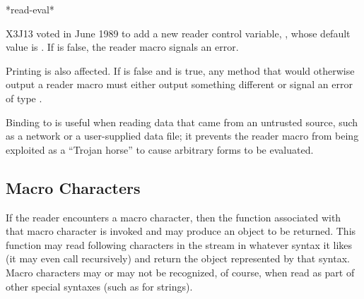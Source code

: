 \begin{newer}
\begin{defun}[Variable]
*read-eval*

X3J13 voted in June 1989  to add a new reader control variable,
, whose default value is .
If  is false, the  reader macro signals an error.

Printing is also affected.  If
   is false and  is true, any 
  method that would otherwise output a  reader macro must either output something
  different or signal an error of type .

Binding  to  is useful when reading data that came from
  an untrusted source, such as a network or a user-supplied data file; it
  prevents the  reader macro from being exploited as a ``Trojan horse'' to
  cause arbitrary forms to be evaluated.
\end{defun}
\end{newer}

\subsection{Macro Characters}
\label{MACRO-CHARACTERS-SECTION}
If the reader encounters a macro
character, then the function associated with that macro character is
invoked and may produce an object to be returned.  This function may read
following characters in the stream in whatever syntax it likes (it may
even call  recursively) and return the object represented by
that syntax.  Macro characters may or may not be recognized, of course,
when read as part of other special syntaxes (such as for strings).

